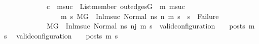 \begin{isabellebody}
\ \ \ \ \ \ \ \ \ \ \ \ {\isacharparenleft}{\kern0pt}{\isasymnot}c\ {\isasymlongrightarrow}\ {\isacharparenleft}{\kern0pt}{\isasymforall}msuc{}{\isachardot}{\kern0pt}\ \ List{\isachardot}{\kern0pt}member\ {\isacharparenleft}{\kern0pt}out{\isacharunderscore}{\kern0pt}edges{\isacharparenleft}{\kern0pt}G{}{\isacharparenright}{\kern0pt}\ {\isacharbang}{\kern0pt}\ m{}{\isacharparenright}{\kern0pt}\ msuc{}\ {\isasymlongrightarrow}\isanewline
\ \ \ \ \ \ \ \ \ \ \ \ \ \ \ \ {\isacharparenleft}{\kern0pt}{\isasymforall}m{}\ s{}{\isachardot}{\kern0pt}\ {\isacharparenleft}{\kern0pt}{\isacharparenleft}{\kern0pt}M{\isacharcomma}{\kern0pt}{\isasymLambda}{\isacharcomma}{\kern0pt}{\isasymGamma}{\isacharcomma}{\kern0pt}{\isasymOmega}{\isacharcomma}{\kern0pt}G{}\ {\isasymturnstile}\ {\isacharparenleft}{\kern0pt}Inl{\isacharparenleft}{\kern0pt}msuc{}{\isacharparenright}{\kern0pt}{\isacharcomma}{\kern0pt}\ Normal\ ns{}{\isacharprime}{\kern0pt}{\isacharprime}{\kern0pt}{\isacharparenright}{\kern0pt}\ {\isacharminus}{\kern0pt}n{\isasymrightarrow}{\isacharasterisk}{\kern0pt}\ {\isacharparenleft}{\kern0pt}m{}{\isacharcomma}{\kern0pt}\ s{}{\isacharparenright}{\kern0pt}{\isacharparenright}{\kern0pt}\ {\isasymlongrightarrow}\ s{}\ {\isasymnoteq}\ Failure{\isacharparenright}{\kern0pt}{\isacharparenright}{\kern0pt}{\isacharparenright}{\kern0pt}{\isacharparenright}{\kern0pt}\ {\isasymLongrightarrow}\isanewline
\ \ \ \ \ \ \ \ \ \ \ \ M{\isacharcomma}{\kern0pt}{\isasymLambda}{\isacharcomma}{\kern0pt}{\isasymGamma}{\isacharcomma}{\kern0pt}{\isasymOmega}{\isacharcomma}{\kern0pt}G{}\ {\isasymturnstile}\ {\isacharparenleft}{\kern0pt}Inl{\isacharparenleft}{\kern0pt}msuc{\isacharparenright}{\kern0pt}{\isacharcomma}{\kern0pt}\ Normal\ ns{}{\isacharprime}{\kern0pt}{\isacharprime}{\kern0pt}{\isacharparenright}{\kern0pt}\ {\isacharminus}{\kern0pt}n{\isasymrightarrow}{\isacharcircum}{\kern0pt}j{\isacharprime}{\kern0pt}\ {\isacharparenleft}{\kern0pt}m{\isacharprime}{\kern0pt}{\isacharcomma}{\kern0pt}\ s{\isacharprime}{\kern0pt}{\isacharparenright}{\kern0pt}\ {\isasymLongrightarrow}\ valid{\isacharunderscore}{\kern0pt}configuration\ {\isasymLambda}\ {\isasymGamma}\ {\isasymOmega}\ posts\ m{\isacharprime}{\kern0pt}\ s{\isacharprime}{\kern0pt}{\isachardoublequoteclose}\isanewline
\ \ {\isachardoublequoteopen}valid{\isacharunderscore}{\kern0pt}configuration\ {\isasymLambda}\ {\isasymGamma}\ {\isasymOmega}\ posts\ m{\isacharprime}{\kern0pt}\ s{\isacharprime}{\kern0pt}{\isachardoublequoteclose}\isanewline

\end{isabellebody}
